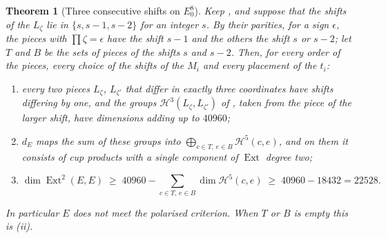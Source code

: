 \documentclass[11pt,reqno]{amsart}
\theoremstyle{plain}
\newtheorem{theorem}{Theorem}[section]
\theoremstyle{definition}
\theoremstyle{remark}
\newcommand{\cH}{\mathcal{H}}
\DeclareMathOperator{\Ext}{Ext}
\begin{document}
\begin{theorem}[Three consecutive shifts on $E_{0}^{8}$]
\label{thm:efourthreelevels}
Keep , and suppose that the shifts of the $L_{\zeta}$
lie in $\{s,s-1,s-2\}$ for an integer $s$. By their parities, for a sign
$\epsilon$, the pieces with $\prod\zeta=\epsilon$ have the shift $s-1$ and
the others the shift $s$ or $s-2$; let $T$ and $B$ be the sets of pieces of
the shifts $s$ and $s-2$. Then, for every order of the pieces, every choice
of the shifts of the $M_{i}$ and every placement of the $t_{i}$:
\begin{enumerate}[label=\textup{(\roman*)},leftmargin=2.6em,itemsep=2pt]
\item every two pieces $L_{\zeta}$, $L_{\zeta'}$ that differ in exactly three
  coordinates have shifts differing by one, and the groups
  $\cH^{3}(L_{\zeta},L_{\zeta'})$ of , taken from
  the piece of the larger shift, have dimensions adding up to $40960$;
\item $d_{E}$ maps the sum of these groups into
  $\bigoplus_{c\in T,\,e\in B}\cH^{5}(c,e)$, and on them it consists of cup
  products with a single component of $\Ext$ degree two;
\item
  \[
    \dim\Ext^{2}(E,E)\;\ge\;40960-\sum_{c\in T,\,e\in B}\dim\cH^{5}(c,e)
    \;\ge\;40960-18432=22528 .
  \]
\end{enumerate}
In particular $E$ does not meet the polarised criterion. When $T$ or $B$ is
empty this is (ii).
\end{theorem}
\end{document}

